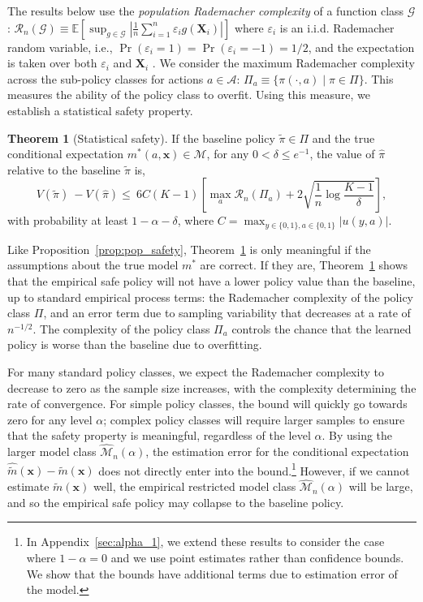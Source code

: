 \documentclass[12pt]{article}
\theoremstyle{definition}
\newtheorem{theorem}{Theorem}
\newcommand{\E}{\ensuremath{\mathbb{E}}}
\newcommand{\bX}{\bm X}
\newcommand{\bx}{\bm x}
\newcommand{\<}{\langle}
\renewcommand{\>}{\rangle}
\newcommand\mcal[1]{\ensuremath{\mathcal{#1}}}
\begin{document}
The results below use the \emph{population Rademacher complexity} of a
function class $\mathcal{G}$:
$
\mcal{R}_n(\mathcal{G})  \equiv \E\left[\sup_{g \in \mathcal{G}}\left|\frac{1}{n}\sum_{i=1}^n \varepsilon_i g(\bX_i)\right|\right]
$
where $\varepsilon_i$ is an i.i.d. Rademacher random variable, i.e.,
$\Pr(\varepsilon_i=1)=\Pr(\varepsilon_i=-1)=1/2$, and the expectation
is taken over both $\varepsilon_i$ and $\bX_i$ \citep[ \S
4]{wainwright_2019}.  We consider the maximum Rademacher complexity
across the sub-policy classes for actions $a \in \mathcal{A}$:
$\Pi_a \equiv \{\pi(\cdot, a ) \mid \pi \in \Pi\}$.
This measures the ability of the policy class to overfit.
Using this measure, we establish a statistical safety property.
\begin{theorem}[Statistical safety]
  \label{thm:emp_safety} \singlespacing
  If the baseline policy
  $\tilde{\pi} \in \Pi$ and the true conditional expectation
  $m^\ast(a,\bx) \in \mcal{M}$, for any $0 < \delta \leq e^{-1}$, the value of
  $\hat{\pi}$ relative to the baseline $\tilde{\pi}$ is,
  \[
    V(\tilde{\pi})\ - V(\hat{\pi})\leq   \ 6 C (K-1) \left[\max_{a} \mathcal{R}_n(\Pi_a) + 2\sqrt{\frac{1}{n}\log \frac{K-1}{\delta}} \right],
  \]
  with probability at least $1 - \alpha  - \delta$,
  where $C = \max_{y \in \{0,1\}, a \in \{0, 1\}} |u(y, a)|$.
\end{theorem}

Like Proposition~\ref{prop:pop_safety}, Theorem~\ref{thm:emp_safety} is only meaningful
if the assumptions about the true model $m^\ast$ are correct.
If they are, Theorem~\ref{thm:emp_safety} shows that the empirical safe policy
will not have a lower policy value than the baseline, up to standard
empirical process terms:
the Rademacher complexity of the policy class $\Pi$, and an error term
due to sampling variability that decreases at a rate of $n^{-1/2}$.
The complexity of the policy class $\Pi_a$ controls the chance that the learned
policy is worse than the baseline due to overfitting.

For many standard
policy classes, we expect the Rademacher complexity to decrease to
zero as the sample size increases, with the complexity determining the
rate of convergence.  For simple policy classes, the bound will
quickly go towards zero for any level $\alpha$; complex policy classes
will require larger samples to ensure that the safety property is
meaningful, regardless of the level $\alpha$.
%
By using the larger model class
$\widehat{\mcal{M}}_n(\alpha)$, the estimation error for the
conditional expectation $\hat{\tilde{m}}(\bx) - \tilde{m}(\bx)$ does not
directly enter into the bound.\footnote{In Appendix~\ref{sec:alpha_1}, we extend these results to consider the case where $1 - \alpha = 0$ and we use point estimates rather than confidence bounds. We show that the bounds have additional terms  due to estimation error of the model.} However, if we cannot estimate
$\tilde{m}(\bx)$ well, the empirical restricted model class
$\widehat{\mcal{M}}_n(\alpha)$ will be large, and so the empirical
safe policy may collapse to the baseline policy.
\end{document}
